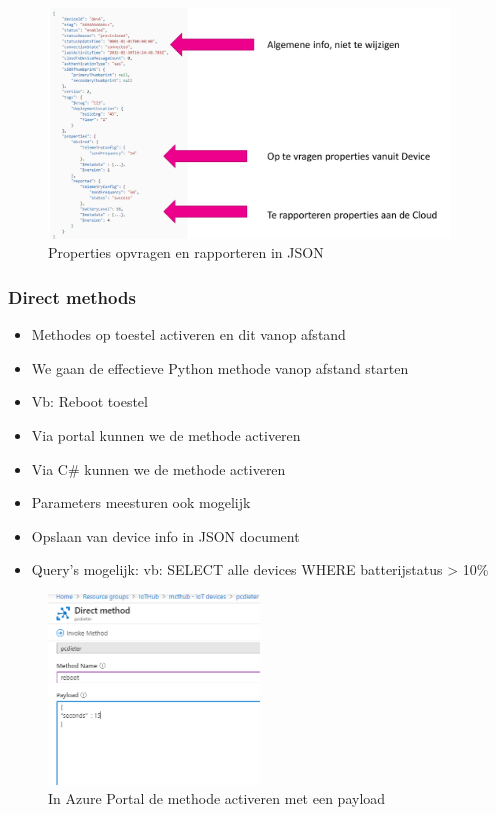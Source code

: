 \documentclass{article}
\begin{document}
\begin{figure}[H]
    \centering
    \includegraphics[width=0.95\textwidth]{iot-device-twin2.png}
    \caption{Properties opvragen en rapporteren in JSON}
\end{figure}

\subsubsection{Direct methods}

\begin{itemize}
    \item Methodes op toestel activeren en dit vanop afstand
    \item We gaan de effectieve Python methode vanop afstand starten
    \item Vb: Reboot toestel
    \item Via portal kunnen we de methode activeren
    \item Via C\# kunnen we de methode activeren
    \item Parameters meesturen ook mogelijk
    \item Opslaan van device info in JSON document
    \item Query's mogelijk: vb: SELECT alle devices WHERE batterijstatus > 10\%
\end{itemize}

\begin{figure}[H]
    \centering
    \includegraphics[width=0.5\textwidth]{iot-hub-device-direct-method-portal.png}
    \caption{In Azure Portal de methode activeren met een payload}
\end{figure}
\end{document}
